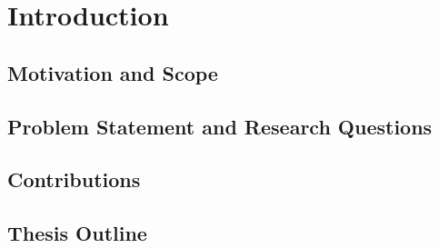 

\chapter{Introduction}\label{chapter:introduction}  %

\placeholder{}

\ifpdf
    \graphicspath{{Chapter1/Figs/Raster/}{Chapter1/Figs/PDF/}{Chapter1/Figs/}}
\else
    \graphicspath{{Chapter1/Figs/Vector/}{Chapter1/Figs/}}
\fi


\section{Motivation and Scope} %




\section{Problem Statement and Research Questions}  %


\section{Contributions}


\section{Thesis Outline} 

